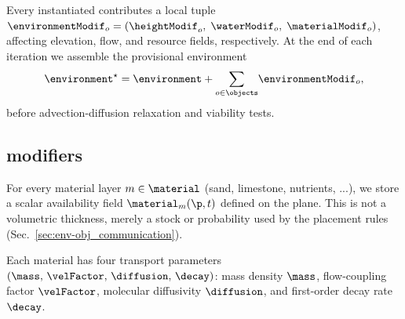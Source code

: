 

\section{}
\label{sec:env-obj_materials}

Every instantiated  contributes a local  tuple $\environmentModif_o=(\heightModif_o,\;\waterModif_o,\;\materialModif_o)$, affecting elevation, flow, and resource fields, respectively. At the end of each iteration we assemble the provisional environment
\begin{align}
  \environment^{\star} = \environment + {\sum_{o\in\objects}}\environmentModif_o,
\end{align}
before advection-diffusion relaxation and viability tests.

\subsection{ modifiers}
For every material layer $m \in \material$ (sand, limestone, nutrients, ...), we store a scalar availability field $\material_m(\p,t)$ defined on the plane. This is not a volumetric thickness, merely a stock or probability used by the placement rules (Sec.~\ref{sec:env-obj_communication}).

Each material has four transport parameters $(\mass,\,\velFactor,\,\diffusion,\,\decay)$: mass density $\mass$, flow-coupling factor $\velFactor$, molecular diffusivity $\diffusion$, and first-order decay rate $\decay$.


